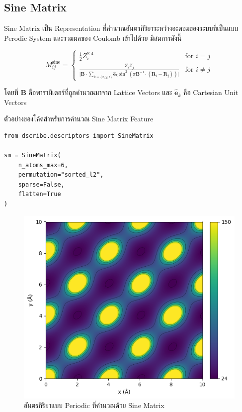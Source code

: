 \subsection{Sine Matrix}
\label{ssec:sine_matrix}

Sine Matrix เป็น Representation ที่คำนวณอันตรกิริยาระหว่างอะตอมของระบบที่เป็นแบบ Perodic System และรวมผลของ Coulomb 
เข้าไปด้วย\autocite{faber2015} มีสมการดังนี้

\begin{equation}\label{eq:sine_matrix}
    M_{ij}^\mathrm{sine} = \left \{
        \begin{matrix}
        \frac{1}{2} Z_i^{2.4} & \text{for } i = j \\
            \frac{Z_i Z_j}{\lvert \mathbf{B} \cdot \sum_{k=\{x,y,z\}} \hat{\mathbf{e}}_k \sin^2 
            \left ( \pi \mathbf{B}^{-1} \cdot \left ( \mathbf{R}_{i} - \mathbf{R}_{j} \right ) \right ) \rvert} 
            & \text{for } i \neq j
        \end{matrix}
        \right .
\end{equation}

\noindent โดยที่ $\mathbf{B}$ คือพารามิเตอร์ที่ถูกคำนวณมาจาก Lattice Vectors และ $\hat{\mathbf{e}}_k$ คือ Cartesian 
Unit Vectors 

ตัวอย่างของโค้ดสำหรับการคำนวณ Sine Matrix Feature

\begin{lstlisting}[style=MyPython]
from dscribe.descriptors import SineMatrix

sm = SineMatrix(
    n_atoms_max=6,
    permutation="sorted_l2",
    sparse=False,
    flatten=True
)
\end{lstlisting}

\begin{figure}[htbp]
    \centering
    \includegraphics[width=0.9\linewidth]{fig/sine_matrix.png}
    \caption{อันตรกิริยาแบบ Periodic ที่คำนวณด้วย Sine Matrix}
    \label{fig:sine_matrix}
\end{figure}

